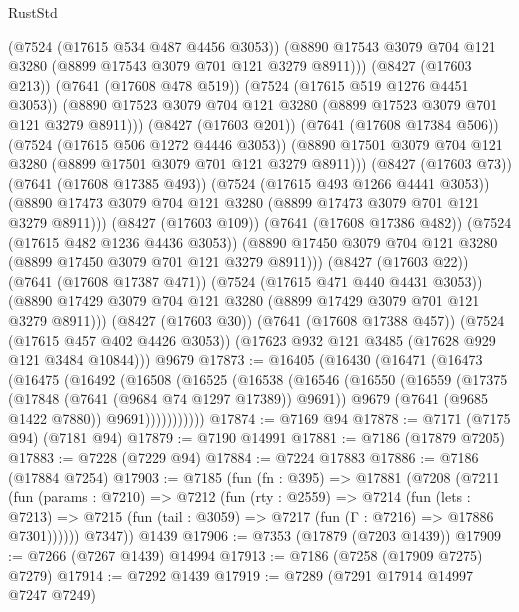 \begin{lexlean}{RustStd}
\begin{coremodule}
{\begin{coremodule}
{{{{{{{{{{{{{{{{{{{{{{{{{{{{{{{{                  (@7524 (@17615 @534 @487 @4456 @3053))
                  (@8890 @17543 @3079 @704 @121 @3280 (@8899 @17543 @3079 @701 @121 @3279 @8911)))
                (@8427 (@17603 @213))
                (@7641 (@17608 @478 @519))
                (@7524 (@17615 @519 @1276 @4451 @3053))
                (@8890 @17523 @3079 @704 @121 @3280 (@8899 @17523 @3079 @701 @121 @3279 @8911)))
              (@8427 (@17603 @201))
              (@7641 (@17608 @17384 @506))
              (@7524 (@17615 @506 @1272 @4446 @3053))
              (@8890 @17501 @3079 @704 @121 @3280 (@8899 @17501 @3079 @701 @121 @3279 @8911)))
            (@8427 (@17603 @73))
            (@7641 (@17608 @17385 @493))
            (@7524 (@17615 @493 @1266 @4441 @3053))
            (@8890 @17473 @3079 @704 @121 @3280 (@8899 @17473 @3079 @701 @121 @3279 @8911)))
          (@8427 (@17603 @109))
          (@7641 (@17608 @17386 @482))
          (@7524 (@17615 @482 @1236 @4436 @3053))
          (@8890 @17450 @3079 @704 @121 @3280 (@8899 @17450 @3079 @701 @121 @3279 @8911)))
        (@8427 (@17603 @22))
        (@7641 (@17608 @17387 @471))
        (@7524 (@17615 @471 @440 @4431 @3053))
        (@8890 @17429 @3079 @704 @121 @3280 (@8899 @17429 @3079 @701 @121 @3279 @8911)))
      (@8427 (@17603 @30))
      (@7641 (@17608 @17388 @457))
      (@7524 (@17615 @457 @402 @4426 @3053))
      (@17623 @932 @121 @3485 (@17628 @929 @121 @3484 @10844)))
    @9679
@17873 := @16405
    (@16430
      (@16471
        (@16473
          (@16475
            (@16492
              (@16508
                (@16525
                  (@16538
                    (@16546
                      (@16550
                        (@16559
                          (@17375 (@17848 (@7641 (@9684 @74 @1297 @17389)) @9691))
                          @9679
                          (@7641 (@9685 @1422 @7880))
                          @9691)))))))))))
@17874 := @7169 @94
@17878 := @7171 (@7175 @94) (@7181 @94)
@17879 := @7190 @14991
@17881 := @7186 (@17879 @7205)
@17883 := @7228 (@7229 @94)
@17884 := @7224 @17883
@17886 := @7186 (@17884 @7254)
@17903 := @7185
    (fun (fn : @395) =>
    @17881
      (@7208
        (@7211
          (fun (params : @7210) =>
          @7212
            (fun (rty : @2559) =>
            @7214
              (fun (lets : @7213) =>
              @7215 (fun (tail : @3059) => @7217 (fun (Γ : @7216) => @17886 @7301))))))
        @7347))
    @1439
@17906 := @7353 (@17879 (@7203 @1439))
@17909 := @7266 (@7267 @1439) @14994
@17913 := @7186 (@7258 (@17909 @7275) @7279)
@17914 := @7292 @1439
@17919 := @7289 (@7291 @17914 @14997 @7247 @7249)
}}}}}}}}}}}}}}}}}}}}}}}}}}}}}}}}
\end{coremodule}}
\end{coremodule}
\end{lexlean}
